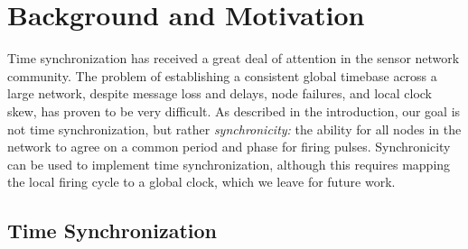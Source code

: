 \section{Background and Motivation}
\label{sec-background}

Time synchronization has received a great deal of attention in the
sensor network community. The problem of establishing a consistent global
timebase across a large network, despite message loss and delays, node
failures, and local clock skew, has proven to be very difficult. As
described in the introduction, our goal is not time synchronization,
but rather {\em synchronicity:} the ability for all nodes in the
network to agree on a common period and phase for firing
pulses. Synchronicity can be used to implement time synchronization,
although this requires mapping the local firing cycle to a
global clock, which we leave for future work. 




\subsection{Time Synchronization}


